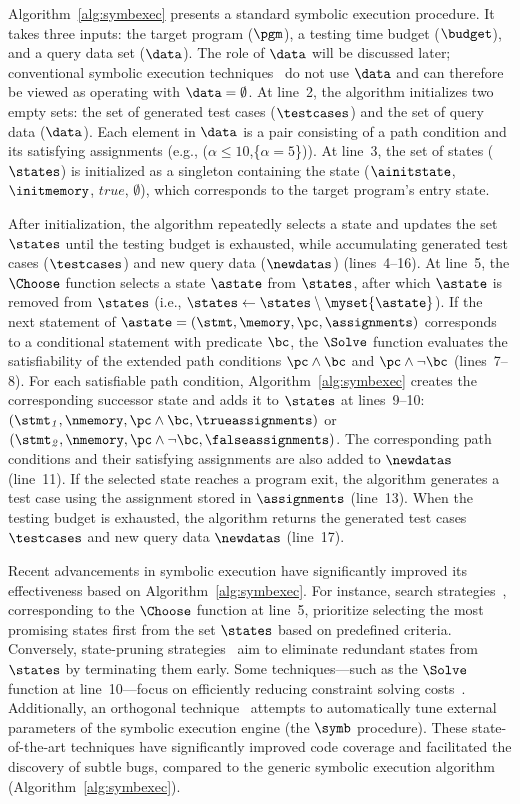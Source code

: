 Algorithm~\ref{alg:symbexec} presents a standard symbolic execution procedure. It takes three inputs: the target program ($\pgm$), a testing time budget ($\budget$), and a query data set ($\data$). The role of $\data$ will be discussed later; conventional symbolic execution techniques~\cite{Cadar2008,du2026fense,yao2025empc,lee2025topseed} do not use $\data$ and can therefore be viewed as operating with $\data=\emptyset$. At line~2, the algorithm initializes two empty sets: the set of generated test cases ($\testcases$) and the set of query data ($\data$). Each element in $\data$ is a pair consisting of a path condition and its satisfying assignments (e.g., ($\alpha \le 10$,\{$\alpha = 5$\})). At line~3, the set of states ($\states$) is initialized as a singleton containing the state ($\ainitstate$, $\initmemory$, $true$, $\emptyset$), which corresponds to the target program's entry state.

After initialization, the algorithm repeatedly selects a state and updates the set $\states$ until the testing budget is exhausted, while accumulating generated test cases ($\testcases$) and new query data ($\newdatas$) (lines~4--16). At line~5, the $\Choose$ function selects a state $\astate$ from $\states$, after which $\astate$ is removed from $\states$ (i.e., $\states \gets \states \setminus \myset{\astate}$). If the next statement of $\astate=(\stmt,\memory,\pc,\assignments)$ corresponds to a conditional statement with predicate $\bc$, the $\Solve$ function evaluates the satisfiability of the extended path conditions $\pc \wedge \bc$ and $\pc \wedge \neg\bc$ (lines~7--8). For each satisfiable path condition, Algorithm~\ref{alg:symbexec} creates the corresponding successor state and adds it to $\states$ at lines~9--10: $(\stmt_{\it 1}, \nmemory, \pc \wedge \bc, \trueassignments)$ or $(\stmt_{\it 2}, \nmemory, \pc \wedge \neg\bc, \falseassignments)$. The corresponding path conditions and their satisfying assignments are also added to $\newdatas$ (line~11). If the selected state reaches a program exit, the algorithm generates a test case using the assignment stored in $\assignments$ (line~13). When the testing budget is exhausted, the algorithm returns the generated test cases $\testcases$ and new query data $\newdatas$ (line~17).

\iffalse
Recent advancements in symbolic execution have significantly improved its effectiveness based on Algorithm~\ref{alg:symbexec}. For instance, search strategies~\cite{learch,yao2025empc}, corresponding to the $\Choose$ function at line~5, prioritize selecting the most promising states first from the set $\states$ based on predefined criteria. Conversely, state-pruning strategies~\cite{homi,chen2018dynamic} aim to eliminate redundant states from $\states$ by terminating them early. Some techniques---such as the $\Solve$ function at line~10---focus on efficiently reducing constraint solving costs~\cite{kleeaaqc,partialcaching}. Additionally, an orthogonal technique~\cite{symtuner} attempts to automatically tune external parameters of the symbolic execution engine (the $\symb$ procedure). These state-of-the-art techniques have significantly improved code coverage and facilitated the discovery of subtle bugs, compared to the generic symbolic execution algorithm (Algorithm~\ref{alg:symbexec}).

